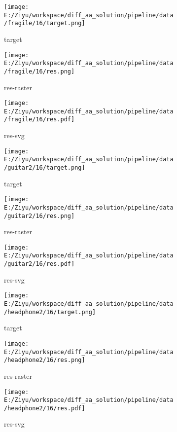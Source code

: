 \documentclass{article}%
\begin{document}
%


\begin{figure}[H]%
\begin{subfigure}[b]{0.32\linewidth}%
\texttt{[image: E:/Ziyu/workspace/diff\_aa\_solution/pipeline/data/fragile/16/target.png]}%
\caption{target}%
\end{subfigure}%
\begin{subfigure}[b]{0.32\linewidth}%
\texttt{[image: E:/Ziyu/workspace/diff\_aa\_solution/pipeline/data/fragile/16/res.png]}%
\caption{res{-}raster}%
\end{subfigure}%
\begin{subfigure}[b]{0.32\linewidth}%
\texttt{[image: E:/Ziyu/workspace/diff\_aa\_solution/pipeline/data/fragile/16/res.pdf]}%
\caption{res{-}svg}%
\end{subfigure}%
\par\vspace{1em}%
\caption{}%
\clearpage%
\end{figure}

%


\begin{figure}[H]%
\begin{subfigure}[b]{0.32\linewidth}%
\texttt{[image: E:/Ziyu/workspace/diff\_aa\_solution/pipeline/data/guitar2/16/target.png]}%
\caption{target}%
\end{subfigure}%
\begin{subfigure}[b]{0.32\linewidth}%
\texttt{[image: E:/Ziyu/workspace/diff\_aa\_solution/pipeline/data/guitar2/16/res.png]}%
\caption{res{-}raster}%
\end{subfigure}%
\begin{subfigure}[b]{0.32\linewidth}%
\texttt{[image: E:/Ziyu/workspace/diff\_aa\_solution/pipeline/data/guitar2/16/res.pdf]}%
\caption{res{-}svg}%
\end{subfigure}%
\par\vspace{1em}%
\caption{}%
\end{figure}

%


\begin{figure}[H]%
\begin{subfigure}[b]{0.32\linewidth}%
\texttt{[image: E:/Ziyu/workspace/diff\_aa\_solution/pipeline/data/headphone2/16/target.png]}%
\caption{target}%
\end{subfigure}%
\begin{subfigure}[b]{0.32\linewidth}%
\texttt{[image: E:/Ziyu/workspace/diff\_aa\_solution/pipeline/data/headphone2/16/res.png]}%
\caption{res{-}raster}%
\end{subfigure}%
\begin{subfigure}[b]{0.32\linewidth}%
\texttt{[image: E:/Ziyu/workspace/diff\_aa\_solution/pipeline/data/headphone2/16/res.pdf]}%
\caption{res{-}svg}%
\end{subfigure}%
\par\vspace{1em}%
\caption{}%
\end{figure}
\end{document}
